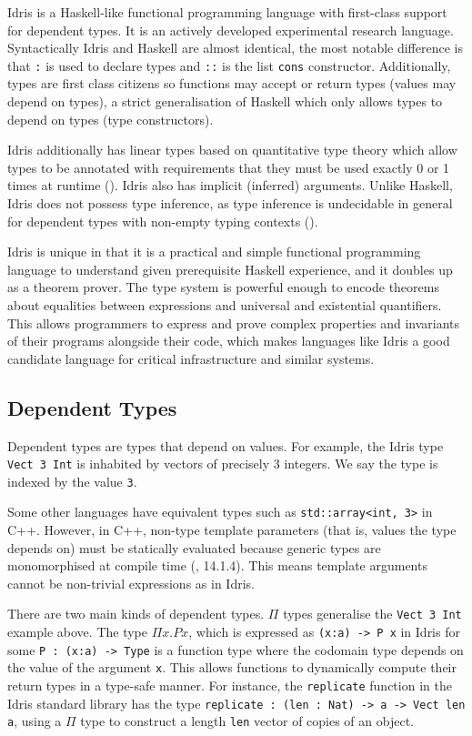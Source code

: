 \documentclass[]{report}
\begin{document}
Idris is a Haskell-like functional programming language with first-class support for dependent types. It is an actively developed experimental research language. Syntactically Idris and Haskell are almost identical, the most notable difference is that \texttt{:} is used to declare types and \texttt{::} is the list \texttt{cons} constructor. Additionally, types are first class citizens so functions may accept or return types (values may depend on types), a strict generalisation of Haskell which only allows types to depend on types (type constructors).

Idris additionally has linear types based on quantitative type theory which allow types to be annotated with requirements that they must be used exactly 0 or 1 times at runtime (\cite{brady2021qtt}). Idris also has implicit (inferred) arguments. Unlike Haskell, Idris does not possess type inference, as type inference is undecidable in general for dependent types with non-empty typing contexts (\cite{dowek1993undecidability}). %

Idris is unique in that it is a practical and simple functional programming language to understand given prerequisite Haskell experience, and it doubles up as a theorem prover. The type system is powerful enough to encode theorems about equalities between expressions and universal and existential quantifiers. This allows programmers to express and prove complex properties and invariants of their programs alongside their code, which makes languages like Idris a good candidate language for critical infrastructure and similar systems.

\subsection{Dependent Types}

Dependent types are types that depend on values. For example, the Idris type \texttt{Vect 3 Int} is inhabited by vectors of precisely 3 integers. We say the type is indexed by the value \texttt{3}.

Some other languages have equivalent types such as \texttt{std::array<int, 3>} in C++. However, in C++, non-type template parameters (that is, values the type depends on) must be statically evaluated because generic types are monomorphised at compile time (\cite{ISO:CPP}, 14.1.4). This means template arguments cannot be non-trivial expressions as in Idris.

There are two main kinds of dependent types. $\Pi$ types generalise the \texttt{Vect 3 Int} example above. The type $\Pi x.Px$, which is expressed as \texttt{(x:a) -> P x} in Idris for some \texttt{P : (x:a) -> Type} is a function type where the codomain type depends on the value of the argument \texttt{x}. This allows functions to dynamically compute their return types in a type-safe manner. For instance, the \texttt{replicate} function in the Idris standard library has the type \texttt{replicate : (len : Nat) -> a -> Vect len a}, using a $\Pi$ type to construct a length \texttt{len} vector of copies of an object.
\end{document}
